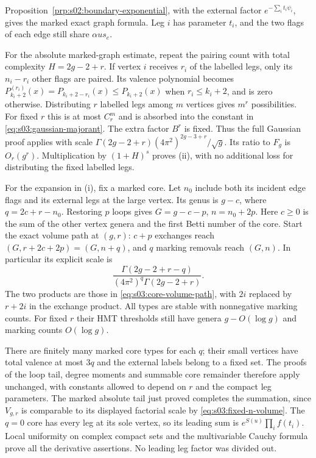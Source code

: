 \begin{prf}
Proposition~\ref{prp:s02:boundary-exponential}, with the external
factor $e^{-\sum_i t_i\psi_i}$, gives the marked exact graph
formula. Leg $i$ has parameter $t_i$, and the two flags of each
edge still share $\alpha u s_e$.

For the absolute marked-graph estimate, repeat the pairing count
with total complexity $H=2g-2+r$. If vertex $i$ receives $r_i$
of the labelled legs, only its $n_i-r_i$ other flags are paired.
Its valence polynomial becomes
$P_{k_i+2}^{(r_i)}(x)=P_{k_i+2-r_i}(x)\leq P_{k_i+2}(x)$
when $r_i\leq k_i+2$, and is zero otherwise. Distributing $r$
labelled legs among $m$ vertices gives $m^r$ possibilities.
For fixed $r$ this is at most $C_r^m$ and is absorbed into the
constant in \eqref{eq:s03:gaussian-majorant}. The extra factor
$B^r$ is fixed. Thus the full Gaussian proof applies with scale
$\Gamma(2g-2+r)(4\pi^2)^{2g-3+r}/\sqrt g$.
Its ratio to $F_g$ is $O_r(g^r)$. Multiplication by $(1+H)^s$
proves \textup{(ii)}, with no additional loss for distributing
the fixed labelled legs.

For the expansion in \textup{(i)}, fix a marked core. Let $n_0$
include both its incident edge flags and its external legs at the
large vertex. Its genus is $g-c$, where
$q=2c+r-n_0$. Restoring $p$ loops gives
$G=g-c-p$, $n=n_0+2p$. Here $c\geq0$ is the sum of the other
vertex genera and the first Betti number of the core.
Start the exact volume path at $(g,r)$: $c+p$ exchanges reach
$(G,r+2c+2p)=(G,n+q)$, and $q$ marking removals reach $(G,n)$.
In particular its explicit scale is
\begin{equation}
\label{eq:s03:marked-volume-scale}
\frac{\Gamma(2g-2+r-q)}
     {(4\pi^2)^q\Gamma(2g-2+r)}.
\end{equation}
The two products are those in \eqref{eq:s03:core-volume-path},
with $2i$ replaced by $r+2i$ in the exchange product.
All types are stable with nonnegative marking counts. For fixed
$r$ their HMT thresholds still have genera $g-O(\log g)$ and
marking counts $O(\log g)$.

There are finitely many marked core types for each $q$; their
small vertices have total valence at most $3q$ and the external
labels belong to a fixed set. The proofs of the loop tail, degree
moments and summable core remainder therefore apply unchanged,
with constants allowed to depend on $r$ and the compact leg
parameters. The marked absolute tail just proved completes the
summation, since $V_{g,r}$ is comparable to its displayed factorial
scale by \eqref{eq:s03:fixed-n-volume}. The $q=0$ core
has every leg at its sole vertex, so its leading sum is
$e^{S(u)}\prod_i f(t_i)$. Local uniformity on complex compact sets
and the multivariable Cauchy formula prove all the derivative
assertions. No leading leg factor was divided out.
\end{prf}

